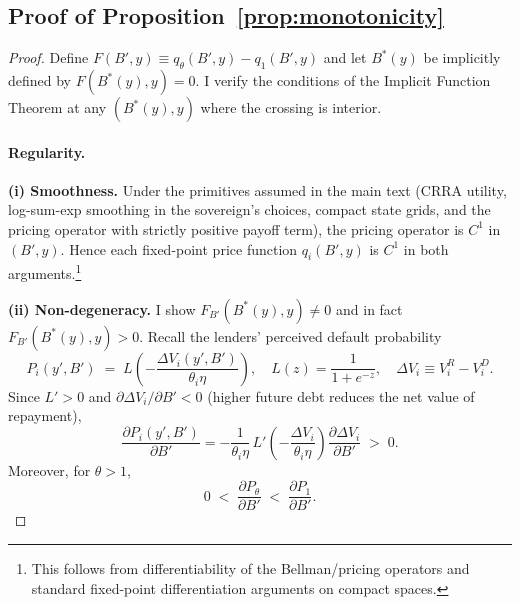 \documentclass[12pt]{article}
\theoremstyle{plain}
\begin{document}
\subsection{Proof of Proposition~\ref{prop:monotonicity}}\label{app:proof_monotonicity}

\begin{proof}
	Define \(F(B',y)\equiv q_\theta(B',y)-q_1(B',y)\) and let \(B^*(y)\) be implicitly defined by \(F(B^*(y),y)=0\).
	I verify the conditions of the Implicit Function Theorem at any \((B^*(y),y)\) where the crossing is interior.

	\paragraph{Regularity.}
	\textbf{(i) Smoothness.} Under the primitives assumed in the main text (CRRA utility, log-sum-exp smoothing in the sovereign’s choices, compact state grids, and the pricing operator with strictly positive payoff term), the pricing operator is \(C^1\) in \((B',y)\). Hence each fixed-point price function \(q_i(B',y)\) is \(C^1\) in both arguments.\footnote{This follows from differentiability of the Bellman/pricing operators and standard fixed-point differentiation arguments on compact spaces.}

	\textbf{(ii) Non-degeneracy.} I show \(F_{B'}(B^*(y),y)\neq 0\) and in fact \(F_{B'}(B^*(y),y)>0\).
	Recall the lenders’ perceived default probability
	\[
		P_i(y',B') \;=\; L\!\left(-\frac{\Delta V_i(y',B')}{\theta_i\eta}\right),
		\quad L(z)=\frac{1}{1+e^{-z}},\quad
		\Delta V_i \equiv V_i^R - V_i^D.
	\]
	Since \(L'>0\) and \(\partial\Delta V_i/\partial B' < 0\) (higher future debt
	reduces the net value of repayment),
	\begin{equation}
		\frac{\partial P_i(y',B')}{\partial B'}
		= -\frac{1}{\theta_i\eta}\,L'\!\left(-\frac{\Delta V_i}{\theta_i\eta}\right)\frac{\partial \Delta V_i}{\partial B'} \;>\; 0.
		\label{eq:Pprime_pos}
	\end{equation}
	Moreover, for \(\theta>1\),
	\begin{equation}
		0 \;<\; \frac{\partial P_\theta}{\partial B'} \;<\; \frac{\partial P_1}{\partial B'}.
		\label{eq:Pprime_order}
	\end{equation}


\end{proof}
\end{document}
